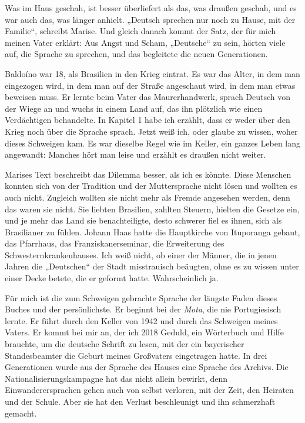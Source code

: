 \documentclass[
  ngerman,
  11pt,
  openany]{book}
\begin{document}
Was im Haus geschah, ist besser überliefert als das, was draußen
geschah, und es war auch das, was länger anhielt. „Deutsch sprechen nur
noch zu Hause, mit der Familie``, schreibt Marise. Und gleich danach
kommt der Satz, der für mich meinen Vater erklärt: Aus Angst und Scham,
„Deutsche`` zu sein, hörten viele auf, die Sprache zu sprechen, und das
begleitete die neuen Generationen.

Baldoíno war 18, als Brasilien in den Krieg eintrat. Es war das Alter,
in dem man eingezogen wird, in dem man auf der Straße angeschaut wird,
in dem man etwas beweisen muss. Er lernte beim Vater das Maurerhandwerk,
sprach Deutsch von der Wiege an und wuchs in einem Land auf, das ihn
plötzlich wie einen Verdächtigen behandelte. In Kapitel 1 habe ich
erzählt, dass er weder über den Krieg noch über die Sprache sprach.
Jetzt weiß ich, oder glaube zu wissen, woher dieses Schweigen kam. Es
war dieselbe Regel wie im Keller, ein ganzes Leben lang angewandt:
Manches hört man leise und erzählt es draußen nicht weiter.

Marises Text beschreibt das Dilemma besser, als ich es könnte. Diese
Menschen konnten sich von der Tradition und der Muttersprache nicht
lösen und wollten es auch nicht. Zugleich wollten sie nicht mehr als
Fremde angesehen werden, denn das waren sie nicht. Sie liebten
Brasilien, zahlten Steuern, hielten die Gesetze ein, und je mehr das
Land sie benachteiligte, desto schwerer fiel es ihnen, sich als
Brasilianer zu fühlen. Johann Haas hatte die Hauptkirche von Ituporanga
gebaut, das Pfarrhaus, das Franziskanerseminar, die Erweiterung des
Schwesternkrankenhauses. Ich weiß nicht, ob einer der Männer, die in
jenen Jahren die „Deutschen`` der Stadt misstrauisch beäugten, ohne es
zu wissen unter einer Decke betete, die er geformt hatte. Wahrscheinlich
ja.

Für mich ist die zum Schweigen gebrachte Sprache der längste Faden
dieses Buches und der persönlichste. Er beginnt bei der \emph{Mota}, die
nie Portugiesisch lernte. Er führt durch den Keller von 1942 und durch
das Schweigen meines Vaters. Er kommt bei mir an, der ich 2018 Geduld,
ein Wörterbuch und Hilfe brauchte, um die deutsche Schrift zu lesen, mit
der ein bayerischer Standesbeamter die Geburt meines Großvaters
eingetragen hatte. In drei Generationen wurde aus der Sprache des Hauses
eine Sprache des Archivs. Die Nationalisierungskampagne hat das nicht
allein bewirkt, denn Einwanderersprachen gehen auch von selbst verloren,
mit der Zeit, den Heiraten und der Schule. Aber sie hat den Verlust
beschleunigt und ihn schmerzhaft gemacht.
\end{document}
